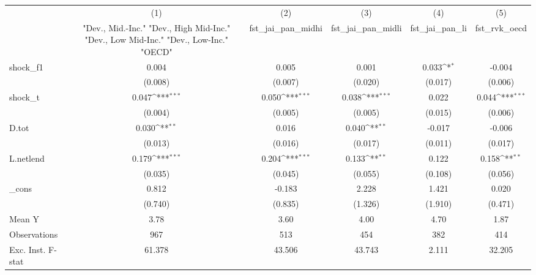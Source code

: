 {
\def\sym#1{\ifmmode^{#1}\else\(^{#1}\)\fi}
\begin{tabular}{l*{5}{c}}
\toprule
            &\multicolumn{1}{c}{(1)}&\multicolumn{1}{c}{(2)}&\multicolumn{1}{c}{(3)}&\multicolumn{1}{c}{(4)}&\multicolumn{1}{c}{(5)}\\
            &\multicolumn{1}{c}{ "Dev., Mid.-Inc." "Dev., High Mid-Inc." "Dev., Low Mid-Inc." "Dev., Low-Inc." "OECD" }&\multicolumn{1}{c}{fst\_jai\_pan\_midhi}&\multicolumn{1}{c}{fst\_jai\_pan\_midli}&\multicolumn{1}{c}{fst\_jai\_pan\_li}&\multicolumn{1}{c}{fst\_rvk\_oecd}\\
\midrule
shock\_f1    &       0.004         &       0.005         &       0.001         &       0.033\sym{*}  &      -0.004         \\
            &     (0.008)         &     (0.007)         &     (0.020)         &     (0.017)         &     (0.006)         \\
\addlinespace
shock\_t     &       0.047\sym{***}&       0.050\sym{***}&       0.038\sym{***}&       0.022         &       0.044\sym{***}\\
            &     (0.004)         &     (0.005)         &     (0.005)         &     (0.015)         &     (0.006)         \\
\addlinespace
D.tot       &       0.030\sym{**} &       0.016         &       0.040\sym{**} &      -0.017         &      -0.006         \\
            &     (0.013)         &     (0.016)         &     (0.017)         &     (0.011)         &     (0.017)         \\
\addlinespace
L.netlend   &       0.179\sym{***}&       0.204\sym{***}&       0.133\sym{**} &       0.122         &       0.158\sym{**} \\
            &     (0.035)         &     (0.045)         &     (0.055)         &     (0.108)         &     (0.056)         \\
\addlinespace
\_cons      &       0.812         &      -0.183         &       2.228         &       1.421         &       0.020         \\
            &     (0.740)         &     (0.835)         &     (1.326)         &     (1.910)         &     (0.471)         \\
\midrule
Mean Y      &        3.78         &        3.60         &        4.00         &        4.70         &        1.87         \\
Observations&         967         &         513         &         454         &         382         &         414         \\
Exc. Inst. F-stat&      61.378         &      43.506         &      43.743         &       2.111         &      32.205         \\
\bottomrule
\end{tabular}
}
